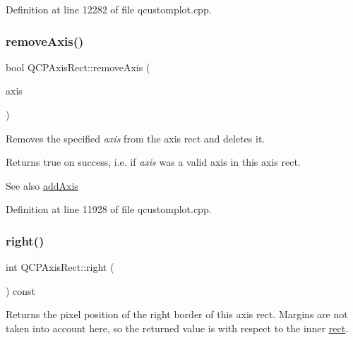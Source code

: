 Definition at line 12282 of file qcustomplot.\+cpp.

\mbox{\label{class_q_c_p_axis_rect_a03c39cd9704f0d36fb6cf980cdddcbaa}} 
\subsubsection{\texorpdfstring{remove\+Axis()}{removeAxis()}}
{\footnotesize\ttfamily bool Q\+C\+P\+Axis\+Rect\+::remove\+Axis (\begin{DoxyParamCaption}\item[{\hyperlink{class_q_c_p_axis}{Q\+C\+P\+Axis} $\ast$}]{axis }\end{DoxyParamCaption})}

Removes the specified {\itshape axis} from the axis rect and deletes it.

Returns true on success, i.\+e. if {\itshape axis} was a valid axis in this axis rect.

\begin{DoxySeeAlso}{See also}
\hyperlink{class_q_c_p_axis_rect_a2dc336092ccc57d44a46194c8a23e4f4}{add\+Axis} 
\end{DoxySeeAlso}


Definition at line 11928 of file qcustomplot.\+cpp.

\mbox{\label{class_q_c_p_axis_rect_a3f819d4a1b2193723d1fdafc573eea10}} 
\subsubsection{\texorpdfstring{right()}{right()}}
{\footnotesize\ttfamily int Q\+C\+P\+Axis\+Rect\+::right (\begin{DoxyParamCaption}{ }\end{DoxyParamCaption}) const\hspace{0.3cm}{\ttfamily [inline]}}

Returns the pixel position of the right border of this axis rect. Margins are not taken into account here, so the returned value is with respect to the inner \hyperlink{class_q_c_p_layout_element_a208effccfe2cca4a0eaf9393e60f2dd4}{rect}. 

